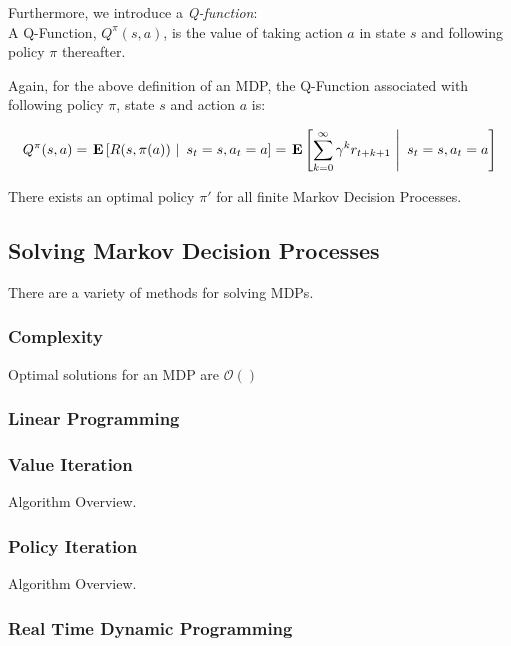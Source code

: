 \documentclass[11pt]{article}
\begin{document}
Furthermore, we introduce a {\it Q-function}: \\

{ A \textup{Q-Function}, $Q^\pi(s,a)$, is the value of taking action $a$ in state $s$ and following policy $\pi$ thereafter}.

Again, for the above definition of an MDP, the Q-Function associated with following policy $\pi$, state $s$ and action $a$ is:

\begin{equation}
Q^\pi(s,a) = \left.\E{R(s,\pi(a))\ \right|\ s_t = s, a_t = a} = \left.\E{\sum_{k=0}^\infty \gamma^k r_{t+k+1}\ \right|\ s_t = s, a_t = a}
\end{equation}

{\lemma There exists an optimal policy $\pi'$ for all finite Markov Decision Processes.}



\subsection{Solving Markov Decision Processes}

There are a variety of methods for solving MDPs.

\subsubsection{Complexity}

{\theorem Optimal solutions for an MDP are $\mathcal{O}()$}

\subsubsection{Linear Programming}


\subsubsection{Value Iteration}

Algorithm Overview.

\subsubsection{Policy Iteration}

Algorithm Overview.

\subsubsection{Real Time Dynamic Programming}
\end{document}
